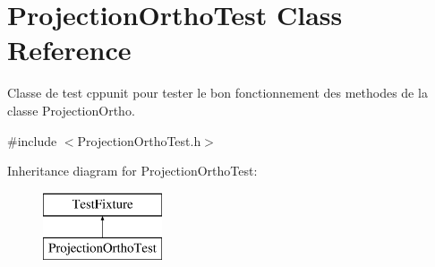 \hypertarget{class_projection_ortho_test}{\section{Projection\-Ortho\-Test Class Reference}
\label{class_projection_ortho_test}
}


Classe de test cppunit pour tester le bon fonctionnement des methodes de la classe Projection\-Ortho.  




{\ttfamily \#include $<$Projection\-Ortho\-Test.\-h$>$}

Inheritance diagram for Projection\-Ortho\-Test\-:\begin{figure}[H]
\begin{center}
\leavevmode
\includegraphics[height=2.000000cm]{class_projection_ortho_test}
\end{center}
\end{figure}
